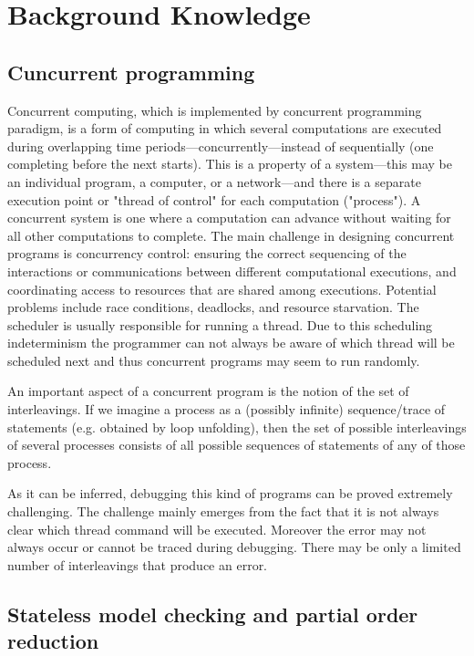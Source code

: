 \chapter{Background Knowledge}
\label{Chapter 2}

\section{Cuncurrent programming}

Concurrent computing, which is implemented by concurrent programming paradigm, is a form of computing in which several 
computations are executed during overlapping time 
periods—concurrently—instead of sequentially (one completing before the next starts). 
This is a property of a system—this may be an individual program, a computer, or a network—and there is a separate execution point 
or "thread of control" for each computation ("process"). A concurrent system is one where a computation can advance without waiting for 
all other computations to complete.
The main challenge in designing concurrent programs is concurrency control: ensuring the correct sequencing of the 
interactions or communications between different computational executions, and coordinating access to resources that are shared among executions.
Potential problems include race conditions, deadlocks, and resource starvation. 
The scheduler is usually responsible for running a thread. Due to this scheduling indeterminism the programmer can not always be aware of which thread
will be scheduled next and thus concurrent programs may seem to run randomly. 

An important aspect of a concurrent program is the notion of the set of interleavings. 
If we imagine a process as a (possibly infinite) sequence/trace of statements (e.g. obtained by loop unfolding),
then the set of possible interleavings of several processes consists of all possible sequences of statements of any of those process.

As it can be inferred, debugging this kind of programs can be proved extremely challenging. The challenge mainly emerges from the fact that it is 
not always clear which thread command will be executed. Moreover the error may not always occur or cannot be traced during debugging. There may be only a limited
number of interleavings that produce an error. 


\section{Stateless model checking and partial order reduction}

